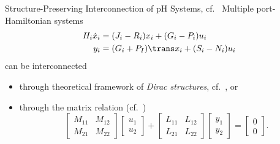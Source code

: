{

    \begin{frame}{Structure-Preserving Interconnection of pH Systems, cf.~\cite{VanDerSchaft2014, Mehrmann2022}}
        Multiple port-Hamiltonian systems
        \begin{align*}
            H_i \dot{x}_i &= (J_i - R_i) x_i + (G_i - P_i) u_i \\
            y_i &= (G_i + P_I)\trans x_i + (S_i - N_i) u_i
        \end{align*}
        can be interconnected
        \begin{itemize}
            \item through theoretical framework of \emph{Dirac structures}, cf.~\cite[Section~6.2]{VanDerSchaft2014}, or
            \item through the matrix relation (cf.~\cite[Section~6.4]{Mehrmann2022})
                \begin{equation*}
                    \begin{bmatrix}
                        M_{11} & M_{12} \\
                        M_{21} & M_{22}
                    \end{bmatrix} \begin{bmatrix}
                        u_1 \\
                        u_2
                    \end{bmatrix} + \begin{bmatrix}
                        L_{11} & L_{12} \\
                        L_{21} & L_{22}
                    \end{bmatrix} \begin{bmatrix}
                        y_1 \\
                        y_2
                    \end{bmatrix} = \begin{bmatrix}
                        0 \\
                        0
                    \end{bmatrix}.
                \end{equation*}
        \end{itemize}
    \end{frame}

}
